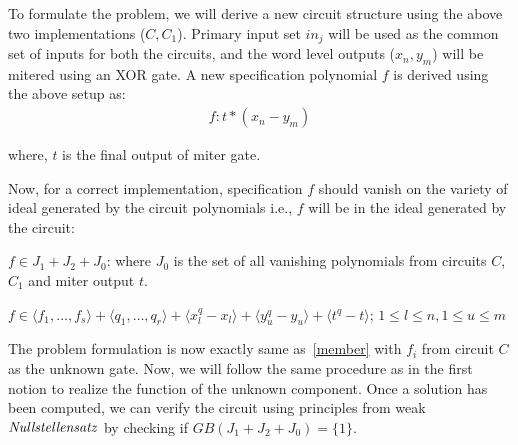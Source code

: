 To formulate the problem, we will derive a new circuit structure using the above two implementations ($C,C_1$). Primary input set $in_j$ will be used as the common set of inputs for both the circuits, and the word level outputs ($x_n,y_m$) will be mitered using an XOR gate. A new specification polynomial $f$ is derived using the above setup as:
\begin{gather}
f : t*(x_n-y_m)
\end{gather}

where, $t$ is the final output of miter gate.

Now, for a correct implementation, specification $f$ should vanish on the variety of ideal generated by the circuit polynomials i.e., $f$ will be in the ideal generated by the circuit:

$f \in J_1 + J_2 + J_0$: where $J_0$ is the set of all vanishing polynomials from circuits $C$, $C_1$ and miter output $t$.

{\small $f \in \langle f_1,\dots,f_s\rangle + \langle q_1,\dots,q_r\rangle + \langle x_l^q-x_l\rangle + \langle y_u^q-y_u\rangle + \langle t^q-t\rangle$; $1\le l \le n,1\le u \le m$}

The problem formulation is now exactly same as~\eqref{member} with $f_i$ from circuit $C$ as the unknown gate. Now, we will follow the same procedure as in the first notion to realize the function of the unknown component. Once a solution has been computed, we can verify the circuit using principles from weak $\it{Nullstellensatz}$ by checking if $GB(J_1+J_2+J_0)=\{1\}$.







